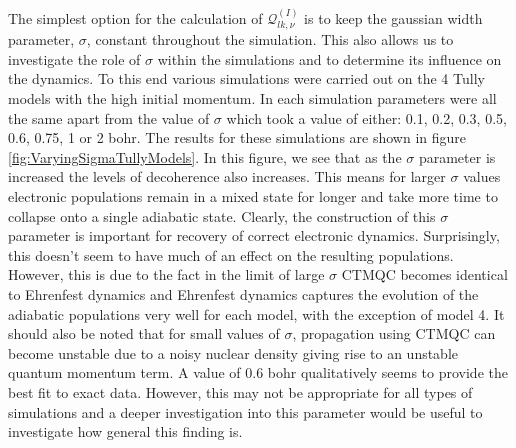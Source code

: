 \noindent The simplest option for the calculation of $\mathcal{Q}_{lk, \nu}^{(I)}$ is to keep the gaussian width parameter, $\sigma$, constant throughout the simulation. This also allows us to investigate the role of $\sigma$ within the simulations and to determine its influence on the dynamics. To this end various simulations were carried out on the 4 Tully models with the high initial momentum. In each simulation parameters were all the same apart from the value of $\sigma$ which took a value of either: 0.1, 0.2, 0.3, 0.5, 0.6, 0.75, 1 or 2 bohr. The results for these simulations are shown in figure \ref{fig:VaryingSigmaTullyModels}. In this figure, we see that as the $\sigma$ parameter is increased the levels of decoherence also increases. This means for larger $\sigma$ values electronic populations remain in a mixed state for longer and take more time to collapse onto a single adiabatic state. Clearly, the construction of this $\sigma$ parameter is important for recovery of correct electronic dynamics. Surprisingly, this doesn't seem to have much of an effect on the resulting populations. However, this is due to the fact in the limit of large $\sigma$ CTMQC becomes identical to Ehrenfest dynamics and Ehrenfest dynamics captures the evolution of the adiabatic populations very well for each model, with the exception of model 4. It should also be noted that for small values of $\sigma$, propagation using CTMQC can become unstable due to a noisy nuclear density giving rise to an unstable quantum momentum term. A value of 0.6 bohr qualitatively seems to provide the best fit to exact data. However, this may not be appropriate for all types of simulations and a deeper investigation into this parameter would be useful to investigate how general this finding is.

